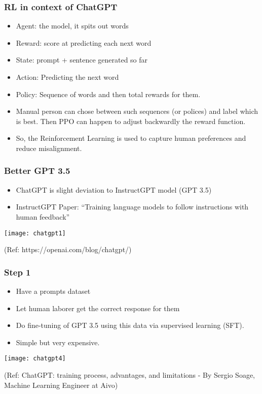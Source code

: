 \begin{frame}[fragile]\frametitle{RL in context of ChatGPT}


\begin{itemize}
\item Agent: the model, it spits out words
\item Reward: score at predicting each next word
\item State: prompt + sentence generated so far
\item Action: Predicting the next word
\item Policy: Sequence of words and then total rewards for them.
\item Manual person can chose between such sequences (or polices) and label which is best. Then PPO can happen to adjust backwardly the reward function.
\item So, the Reinforcement Learning is used to capture human preferences and reduce misalignment.
\end{itemize}	 
\end{frame}

\begin{frame}[fragile]\frametitle{Better GPT 3.5}

\begin{itemize}
\item ChatGPT is slight deviation to InstructGPT model (GPT 3.5)
\item InstructGPT Paper: ``Training language models to follow instructions with human feedback''
\end{itemize}	 

\begin{center}
\texttt{[image: chatgpt1]}
\end{center}		

\tiny{(Ref: https://openai.com/blog/chatgpt/)}
\end{frame}

\begin{frame}[fragile]\frametitle{Step 1}

\begin{itemize}
\item Have a prompts dataset 
\item Let human laborer get the correct response for them
\item Do fine-tuning of GPT 3.5 using this data via supervised learning (SFT). 
\item Simple but very expensive.
\end{itemize}	 

			\begin{center}
			\texttt{[image: chatgpt4]}
			
			\end{center}		
			
			{\tiny (Ref: ChatGPT: training process, advantages, and limitations - By Sergio Soage, Machine Learning Engineer at Aivo)}
			
\end{frame}

